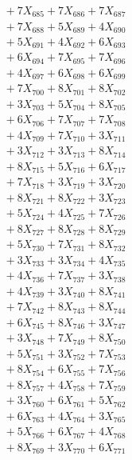 \documentclass[a4paper,10pt]{article}
\begin{document}
{\begin{align}
&\;  + 7 X_{685} + 7 X_{686} + 7 X_{687} \\[0.3ex]
&\;  + 7 X_{688} + 5 X_{689} + 4 X_{690} \\[0.3ex]
&\;  + 5 X_{691} + 4 X_{692} + 6 X_{693} \\[0.3ex]
&\;  + 6 X_{694} + 7 X_{695} + 7 X_{696} \\[0.3ex]
&\;  + 4 X_{697} + 6 X_{698} + 6 X_{699} \\[0.5ex]\allowbreak
&\;  + 7 X_{700} + 8 X_{701} + 8 X_{702} \\[0.3ex]
&\;  + 3 X_{703} + 5 X_{704} + 8 X_{705} \\[0.3ex]
&\;  + 6 X_{706} + 7 X_{707} + 7 X_{708} \\[0.3ex]
&\;  + 4 X_{709} + 7 X_{710} + 3 X_{711} \\[0.3ex]
&\;  + 3 X_{712} + 3 X_{713} + 8 X_{714} \\[0.3ex]
&\;  + 8 X_{715} + 5 X_{716} + 6 X_{717} \\[0.3ex]
&\;  + 7 X_{718} + 3 X_{719} + 3 X_{720} \\[0.3ex]
&\;  + 8 X_{721} + 8 X_{722} + 3 X_{723} \\[0.3ex]
&\;  + 5 X_{724} + 4 X_{725} + 7 X_{726} \\[0.3ex]
&\;  + 8 X_{727} + 8 X_{728} + 8 X_{729} \\[0.5ex]\allowbreak
&\;  + 5 X_{730} + 7 X_{731} + 8 X_{732} \\[0.3ex]
&\;  + 3 X_{733} + 3 X_{734} + 4 X_{735} \\[0.3ex]
&\;  + 4 X_{736} + 7 X_{737} + 3 X_{738} \\[0.3ex]
&\;  + 4 X_{739} + 3 X_{740} + 8 X_{741} \\[0.3ex]
&\;  + 7 X_{742} + 8 X_{743} + 8 X_{744} \\[0.3ex]
&\;  + 6 X_{745} + 8 X_{746} + 3 X_{747} \\[0.3ex]
&\;  + 3 X_{748} + 7 X_{749} + 8 X_{750} \\[0.3ex]
&\;  + 5 X_{751} + 3 X_{752} + 7 X_{753} \\[0.3ex]
&\;  + 8 X_{754} + 6 X_{755} + 7 X_{756} \\[0.3ex]
&\;  + 8 X_{757} + 4 X_{758} + 7 X_{759} \\[0.5ex]\allowbreak
&\;  + 3 X_{760} + 6 X_{761} + 5 X_{762} \\[0.3ex]
&\;  + 6 X_{763} + 4 X_{764} + 3 X_{765} \\[0.3ex]
&\;  + 5 X_{766} + 6 X_{767} + 4 X_{768} \\[0.3ex]
&\;  + 8 X_{769} + 3 X_{770} + 6 X_{771} \\[0.3ex]

\end{align}}
\end{document}
